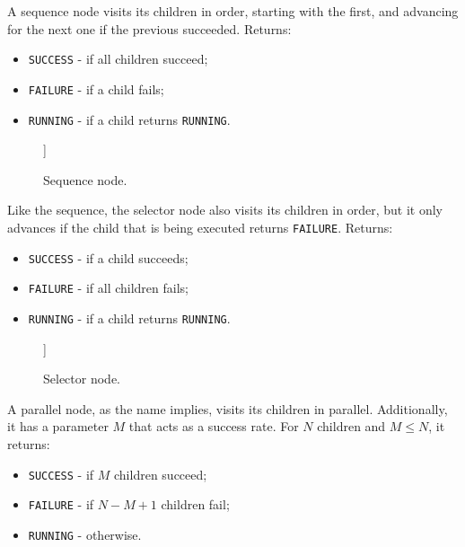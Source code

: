 \documentclass[a4paper,UKenglish,cleveref, autoref, thm-restate]{oasics-v2019}
\begin{document}
A sequence node visits its children in order, starting with the first, and advancing for the next one if the previous succeeded.
Returns:
\begin{itemize}
    \item \texttt{SUCCESS} - if all children succeed;
    \item \texttt{FAILURE} - if a child fails;
    \item \texttt{RUNNING} - if a child returns \texttt{RUNNING}.
\end{itemize}

\begin{figure}[H]
    \centering
    \begin{behavior}
        [\sequence
            [\action{Child 1}]
            [\action{Child 2}]
            [{\textbf{. . .}}, inner sep=10pt]
            [\action{Child N}]
        ]
    \end{behavior}
    \caption{Sequence node.}
    \label{fig:sequence}
\end{figure}

Like the sequence, the selector node also visits its children in order, but it only advances if the child that is being executed returns \texttt{FAILURE}.
Returns:
\begin{itemize}
    \item \texttt{SUCCESS} - if a child succeeds;
    \item \texttt{FAILURE} - if all children fails;
    \item \texttt{RUNNING} - if a child returns \texttt{RUNNING}.
\end{itemize}

\begin{figure}[H]
    \centering
    \begin{behavior}
        [\selector
            [\action{Child 1}]
            [\action{Child 2}]
            [{\textbf{. . .}}, inner sep=10pt]
            [\action{Child N}]
        ]
    \end{behavior}
    \caption{Selector node.}
    \label{fig:selector}
\end{figure}


A parallel node, as the name implies, visits its children in parallel.
Additionally, it has a parameter $M$ that acts as a success rate.
For $N$ children and $M \leq N$, it returns:
\begin{itemize}
    \item \texttt{SUCCESS} - if $M$ children succeed;
    \item \texttt{FAILURE} - if $N - M + 1$ children fail;
    \item \texttt{RUNNING} - otherwise.
\end{itemize}
\end{document}
